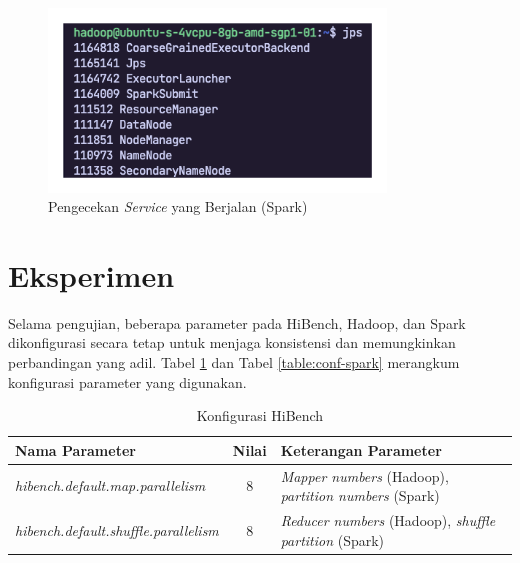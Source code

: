 \begin{enumerate}
\begin{figure}[h]
		    \includegraphics[width=0.8\textwidth]{figures/ch04/service-spark}
		    \caption{Pengecekan \textit{Service} yang Berjalan (Spark)}
		    \label{fig:service-spark}
		\end{figure}
\end{enumerate}

\newpage
\section{Eksperimen}
Selama pengujian, beberapa parameter pada HiBench, Hadoop, dan Spark dikonfigurasi secara tetap untuk menjaga konsistensi dan memungkinkan perbandingan yang adil. Tabel \ref{table:conf-hibench} dan Tabel \ref{table:conf-spark} merangkum konfigurasi parameter yang digunakan.

\begin{table}[h]
\caption{Konfigurasi HiBench}
\label{table:conf-hibench}
\centering
\begin{tabular}{l c p{5cm}} 
\hline
\textbf{Nama Parameter} & \textbf{Nilai} & \textbf{Keterangan Parameter} \\ \hline
\textit{hibench.default.map.parallelism}     & 8 & \textit{Mapper numbers} (Hadoop), \textit{partition numbers} (Spark)                          \\
\textit{hibench.default.shuffle.parallelism} & 8 & \textit{Reducer numbers}  (Hadoop), \textit{shuffle partition} (Spark)\\ \hline                        
\end{tabular}
\end{table}

